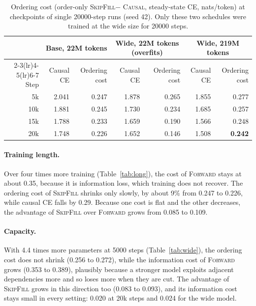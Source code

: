 \documentclass{article}
\theoremstyle{definition}
\theoremstyle{remark}
\newcommand{\name}[1]{\textup{\textsc{#1}}}
\newcommand{\sfill}{\name{SkipFill}\xspace}
\newcommand{\fwd}{\name{Forward}\xspace}
\newcommand{\causal}{\name{Causal}\xspace}
\begin{document}
\begin{table}[t]
  \centering
  \caption{Ordering cost (order-only \sfill $-$ \causal, steady-state CE, nats/token) at checkpoints of single 20000-step runs (seed 42). Only these two schedules were trained at the wide size for 20000 steps.}
  \label{tab:widelong}
  \small
  \begin{tabular}{rrrrrrr}
    \toprule
    & \multicolumn{2}{c}{Base, 22M tokens} & \multicolumn{2}{c}{Wide, 22M tokens (overfits)} & \multicolumn{2}{c}{Wide, 219M tokens} \\
    \cmidrule(lr){2-3}\cmidrule(lr){4-5}\cmidrule(lr){6-7}
    Step & Causal CE & Ordering cost & Causal CE & Ordering cost & Causal CE & Ordering cost \\
    \midrule
    5k  & 2.041 & 0.247 & 1.878 & 0.265 & 1.855 & 0.277 \\
    10k & 1.881 & 0.245 & 1.730 & 0.234 & 1.685 & 0.257 \\
    15k & 1.788 & 0.233 & 1.659 & 0.190 & 1.566 & 0.248 \\
    20k & 1.748 & 0.226 & 1.652 & 0.146 & 1.508 & \textbf{0.242} \\
    \bottomrule
  \end{tabular}
\end{table}

\paragraph{Training length.}
Over four times more training (Table~\ref{tab:long}), the cost of \fwd stays at about 0.35, because it is information loss, which training does not recover.
The ordering cost of \sfill shrinks only slowly, by about 9\% from 0.247 to 0.226, while causal CE falls by 0.29.
Because one cost is flat and the other decreases, the advantage of \sfill over \fwd grows from 0.085 to 0.109.

\paragraph{Capacity.}
With 4.4 times more parameters at 5000 steps (Table~\ref{tab:wide}), the ordering cost does not shrink (0.256 to 0.272), while the information cost of \fwd grows (0.353 to 0.389), plausibly because a stronger model exploits adjacent dependencies more and so loses more when they are cut.
The advantage of \sfill grows in this direction too (0.083 to 0.093), and its information cost stays small in every setting: 0.020 at 20k steps and 0.024 for the wide model.
\end{document}
